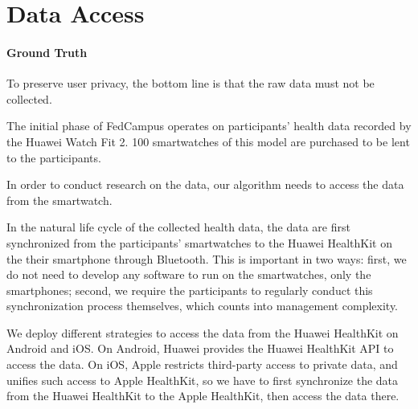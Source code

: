 \section{Data Access}

\paragraph{Ground Truth}
To preserve user privacy,
the bottom line is that the raw data must not be collected.

The initial phase of FedCampus operates on participants' health data recorded by
the Huawei Watch Fit 2.
100 smartwatches of this model are purchased to be lent to the participants.

In order to conduct research on the data,
our algorithm needs to access the data from the smartwatch.

In the natural life cycle of the collected health data,
the data are first synchronized from the participants' smartwatches to
the Huawei HealthKit on the their smartphone through Bluetooth.
This is important in two ways:
first, we do not need to develop any software to run on the smartwatches,
only the smartphones; second,
we require the participants to regularly conduct this synchronization process
themselves, which counts into management complexity.

We deploy different strategies to access the data from the Huawei HealthKit on
Android and iOS.
On Android, Huawei provides the Huawei HealthKit API to access the data.
On iOS, Apple restricts third-party access to private data,
and unifies such access to Apple HealthKit,
so we have to first synchronize the data from the Huawei HealthKit to
the Apple HealthKit, then access the data there.
